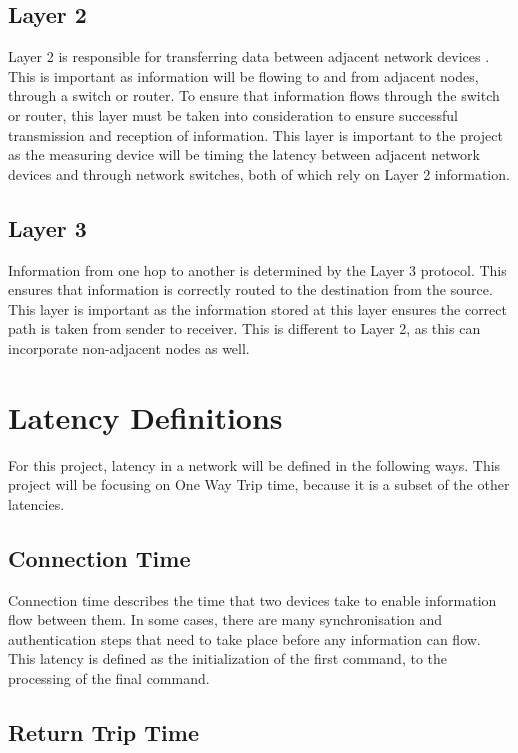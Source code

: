 \subsection{Layer 2}

Layer 2 is responsible for transferring data between adjacent network devices \cite{IEEE802}. This is important as
information will be flowing to and from adjacent nodes, through a switch or router. To ensure that
information flows through the switch or router, this layer must be taken into consideration to ensure
successful transmission and reception of information.
This layer is important to the project as the measuring device will be timing the latency between adjacent network devices and through network switches, both of which rely on Layer 2 information.

\subsection{Layer 3}

Information from one hop to another is determined by the Layer 3 protocol. This ensures that
information is correctly routed to the destination from the source. This layer is important as the
information stored at this layer ensures the correct path is taken from sender to receiver. This is
different to Layer 2, as this can incorporate non-adjacent nodes as well.

\section{Latency Definitions}

For this project, latency in a network will be defined in the following ways. 
This project will be focusing on One Way Trip time, because it is a subset of the other latencies.

\subsection{Connection Time}

Connection time describes the time that two devices take to enable information flow between them. In
some cases, there are many synchronisation and authentication steps that need to take place before
any information can flow. This latency is defined as the initialization of the first command, to the
processing of the final command.

\subsection{Return Trip Time}

